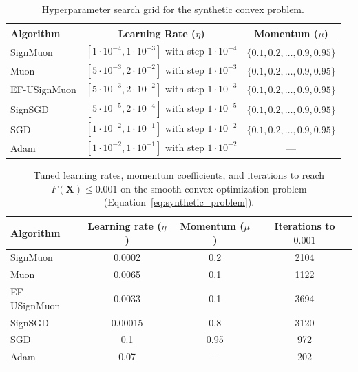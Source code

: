 \documentclass{article}
\begin{document}
\begin{table}[H]
\centering
\caption{Hyperparameter search grid for the synthetic convex problem.}
\label{tab:grid_search}
\small
\renewcommand{\arraystretch}{1.2}
\begin{tabular}{@{}lcc@{}}
\toprule
\textbf{Algorithm} & \textbf{Learning Rate ($\eta$)} & \textbf{Momentum ($\mu$)} \\
\midrule
SignMuon & $[1 \cdot 10^{-4}, 1 \cdot 10^{-3}]$ with step $1 \cdot 10^{-4}$ & $\{0.1, 0.2, \dots, 0.9, 0.95\}$ \\
Muon     & $[5 \cdot 10^{-3}, 2 \cdot 10^{-2}]$ with step $1 \cdot 10^{-3}$ & $\{0.1, 0.2, \dots, 0.9, 0.95\}$ \\
EF-USignMuon & $[5 \cdot 10^{-3}, 2 \cdot 10^{-2}]$ with step $1 \cdot 10^{-3}$ & $\{0.1, 0.2, \dots, 0.9, 0.95\}$ \\
SignSGD  & $[5 \cdot 10^{-5}, 2 \cdot 10^{-4}]$ with step $1 \cdot 10^{-5}$ & $\{0.1, 0.2, \dots, 0.9, 0.95\}$ \\
SGD      & $[1 \cdot 10^{-2}, 1 \cdot 10^{-1}]$ with step $1 \cdot 10^{-2}$ & $\{0.1, 0.2, \dots, 0.9, 0.95\}$ \\
Adam     & $[1 \cdot 10^{-2}, 1 \cdot 10^{-1}]$ with step $1 \cdot 10^{-2}$ & --- \\
\bottomrule
\end{tabular}
\end{table}

\begin{table}[H]
\centering
\caption{Tuned learning rates, momentum coefficients, and iterations to reach $F(\mathbf{X}) \le 0.001$ on the smooth convex optimization problem (Equation~\ref{eq:synthetic_problem}).}
\label{tab:synthetic_results}
\small
\renewcommand{\arraystretch}{1.2}
\begin{tabular}{|l|c|c|c|}
\hline
\textbf{Algorithm} & \textbf{Learning rate ($\eta$)} & \textbf{Momentum ($\mu$)} & \textbf{Iterations to $0.001$} \\
\hline
SignMuon & 0.0002 & 0.2 & 2104 \\
Muon & 0.0065 & 0.1 & 1122 \\
EF-USignMuon & 0.0033 & 0.1 & 3694 \\
SignSGD & 0.00015 & 0.8 & 3120 \\
SGD & 0.1 & 0.95 & 972 \\
Adam &  0.07 & - & 202 \\
\hline
\end{tabular}
\end{table}
\end{document}
